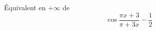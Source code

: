 \'Equivalent en $+\infty$ de 
\begin{displaymath}
 \cos \dfrac{\pi x+3}{\pi + 3x} - \dfrac{1}{2}
\end{displaymath}
\bigskip \bigskip